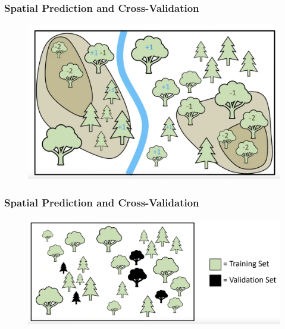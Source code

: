 \documentclass[
  shownotes,
  xcolor={svgnames},
  hyperref={colorlinks,citecolor=DarkBlue,linkcolor=andesred,urlcolor=DarkBlue}
  , aspectratio=169]{beamer}
\begin{document}
\begin{frame}[fragile]
\frametitle{Spatial Prediction and Cross-Validation}

  \begin{minipage}[c]{0.6\linewidth}
        
      \begin{figure}[H] \centering
        \captionsetup{justification=centering}
        \includegraphics[scale=0.3]{figures/spatial_cross/fig06.png}
      \end{figure}
           
    \end{minipage}
    \hfill
    \begin{minipage}[t]{0.35\linewidth}%
    

    \end{minipage}

\end{frame}
\begin{frame}[fragile]
\frametitle{Spatial Prediction and Cross-Validation}

  \begin{minipage}[c]{0.6\linewidth}
        
      \begin{figure}[H] \centering
        \captionsetup{justification=centering}
        \includegraphics[scale=0.3]{figures/spatial_cross/fig07.png}
      \end{figure}
           
    \end{minipage}
    \hfill
    \begin{minipage}[t]{0.35\linewidth}%
    

    \end{minipage}

\end{frame}
\end{document}
